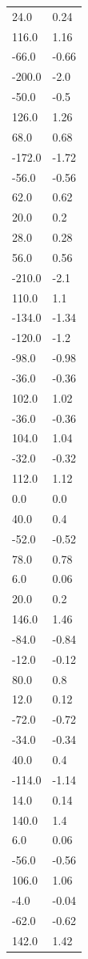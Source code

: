\begin{longtable}{ll}
24.0 & 0.24 \\
116.0 & 1.16 \\
-66.0 & -0.66 \\
-200.0 & -2.0 \\
-50.0 & -0.5 \\
126.0 & 1.26 \\
68.0 & 0.68 \\
-172.0 & -1.72 \\
-56.0 & -0.56 \\
62.0 & 0.62 \\
20.0 & 0.2 \\
28.0 & 0.28 \\
56.0 & 0.56 \\
-210.0 & -2.1 \\
110.0 & 1.1 \\
-134.0 & -1.34 \\
-120.0 & -1.2 \\
-98.0 & -0.98 \\
-36.0 & -0.36 \\
102.0 & 1.02 \\
-36.0 & -0.36 \\
104.0 & 1.04 \\
-32.0 & -0.32 \\
112.0 & 1.12 \\
0.0 & 0.0 \\
40.0 & 0.4 \\
-52.0 & -0.52 \\
78.0 & 0.78 \\
6.0 & 0.06 \\
20.0 & 0.2 \\
146.0 & 1.46 \\
-84.0 & -0.84 \\
-12.0 & -0.12 \\
80.0 & 0.8 \\
12.0 & 0.12 \\
-72.0 & -0.72 \\
-34.0 & -0.34 \\
40.0 & 0.4 \\
-114.0 & -1.14 \\
14.0 & 0.14 \\
140.0 & 1.4 \\
6.0 & 0.06 \\
-56.0 & -0.56 \\
106.0 & 1.06 \\
-4.0 & -0.04 \\
-62.0 & -0.62 \\
142.0 & 1.42 \\

\end{longtable}
